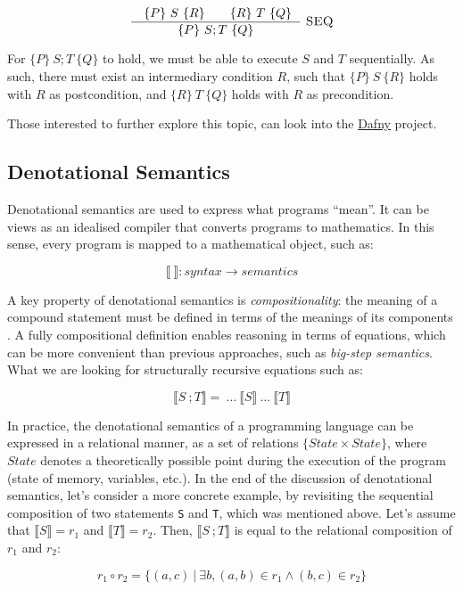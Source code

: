 \documentclass[runningheads]{llncs}
\newcommand{\cc}{\lstinline[mathescape]}
\begin{document}
$$\frac{\quad\{P\}\ S \ \{R\} \qquad \{R\}\ T\ \{Q\}\ \ }
     {\{P\}\ S;T\ \{Q\}}
     \ \textsc{SEQ}$$

For ${\{P\}\ S;T\ \{Q\}}$ to hold, we must be able to execute $S$ and $T$
sequentially. As such, there must exist an intermediary condition $R$, such
that ${\{P\}\ S \ \{R\}}$ holds with $R$ as postcondition, and ${\{R\}\ T \
\{Q\}}$ holds with $R$ as precondition.

Those interested to further explore this topic, can look into the
\href{https://dafny.org/latest/DafnyRef/DafnyRef#sec-introduction}{Dafny}
project.

\subsection{Denotational Semantics}

Denotational semantics are used to express what programs ``mean''. It can be
views as an idealised compiler that converts programs to mathematics. In this
sense, every program is mapped to a mathematical object, such as:

$$\llbracket\ \rrbracket : syntax \to semantics$$

A key property of denotational semantics is \emph{compositionality}: the
meaning of a compound statement must be defined in terms of the meanings of its
components \cite{hitchhiker}. A fully compositional definition enables
reasoning in terms of equations, which can be more convenient than previous
approaches, such as \emph{big-step semantics}. What we are looking for
structurally recursive equations such as:

$$\llbracket S\ ; T \rrbracket =\ \dots\ 
\llbracket S \rrbracket\ \dots\ \llbracket T \rrbracket$$

In practice, the denotational semantics of a programming language can be
expressed in a relational manner, as a set of relations $\{State \times
State\}$, where $State$ denotes a theoretically possible point during the
execution of the program (state of memory, variables, etc.). In the end of the
discussion of denotational semantics, let's consider a more concrete example,
by revisiting the sequential composition of two statements \cc{S} and \cc{T},
which was mentioned above. Let's assume that $\llbracket S \rrbracket = r_1$
and $\llbracket T \rrbracket = r_2$. Then, $\llbracket S\ ; T \rrbracket$ is
equal to the relational composition of $r_1$ and $r_2$:

$$r_1 \circ r_2 = \{(a,c)\ |\ \exists b, (a,b) \in r_1 \land (b,c) \in r_2\}$$
\end{document}
